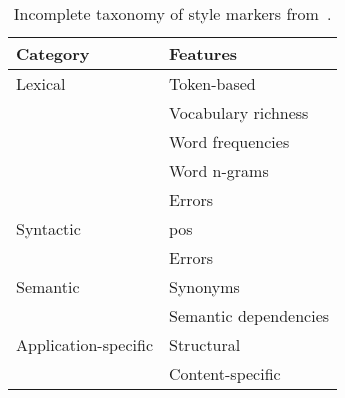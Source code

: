 \begin{table}[h]
    \centering
    \caption[Incomplete taxonomy of style markers]{Incomplete taxonomy of style markers from~\citet{stamatatos_survey_2009}.}
    \label{tab:stylometric_features}
 
    \begin{tabular}{@{}ll@{}} %
    \toprule
    \textbf{Category} & \textbf{Features} \\ 
    \midrule
    Lexical & Token-based \\ %
     & Vocabulary richness  \\
     & Word frequencies  \\
     & Word n-grams  \\
     & Errors \\
    Syntactic & \ac{pos}  \\
     & Errors  \\
    Semantic & Synonyms \\
     & Semantic dependencies \\
    Application-specific & Structural  \\
     & Content-specific\\
     \bottomrule
    \end{tabular}%

\end{table}

